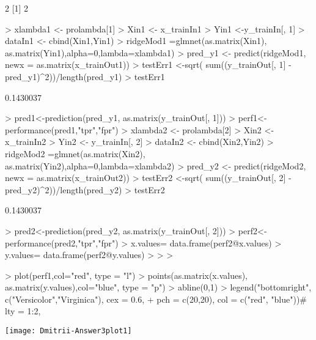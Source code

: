 \documentclass{article}
\begin{document}
\begin{Schunk}
\begin{Soutput}
[1] 2
[1] 2
\end{Soutput}
\begin{Sinput}
> xlambda1 <- prolambda[1]
> Xin1 <- x_trainIn1
> Yin1 <-y_trainIn[, 1]
> dataIn1 <- cbind(Xin1,Yin1)
> ridgeMod1 =glmnet(as.matrix(Xin1), as.matrix(Yin1),alpha=0,lambda=xlambda1)
> pred_y1 <- predict(ridgeMod1, newx = as.matrix(x_trainOut1))
> testErr1 <-sqrt( sum((y_trainOut[, 1] - pred_y1)^2))/length(pred_y1)
> testErr1 
\end{Sinput}
\begin{Soutput}
[1] 0.1430037
\end{Soutput}
\begin{Sinput}
> pred1<-prediction(pred_y1, as.matrix(y_trainOut[, 1]))
> perf1<-performance(pred1,"tpr","fpr")
> xlambda2 <- prolambda[2]
> Xin2 <- x_trainIn2
> Yin2 <- y_trainIn[, 2]
> dataIn2 <- cbind(Xin2,Yin2)
> ridgeMod2 =glmnet(as.matrix(Xin2), as.matrix(Yin2),alpha=0,lambda=xlambda2)
> pred_y2 <- predict(ridgeMod2, newx = as.matrix(x_trainOut2))
> testErr2 <-sqrt( sum((y_trainOut[, 2] -pred_y2)^2))/length(pred_y2)
> testErr2 
\end{Sinput}
\begin{Soutput}
[1] 0.1430037
\end{Soutput}
\begin{Sinput}
> pred2<-prediction(pred_y2, as.matrix(y_trainOut[, 2]))
> perf2<-performance(pred2,"tpr","fpr")
> x.values= data.frame(perf2@x.values)
> y.values= data.frame(perf2@y.values)
> 
> 
> 
\end{Sinput}
\end{Schunk}
\begin{Schunk}
\begin{Sinput}
> plot(perf1,col="red", type = "l") 
> points(as.matrix(x.values), as.matrix(y.values),col="blue", type = "p") 
> abline(0,1)
> legend("bottomright", c("Versicolor","Virginica"), cex = 0.6, 
+        pch = c(20,20), col = c("red", "blue"))# lty = 1:2,
\end{Sinput}
\end{Schunk}
\texttt{[image: Dmitrii-Answer3plot1]}
\end{document}

